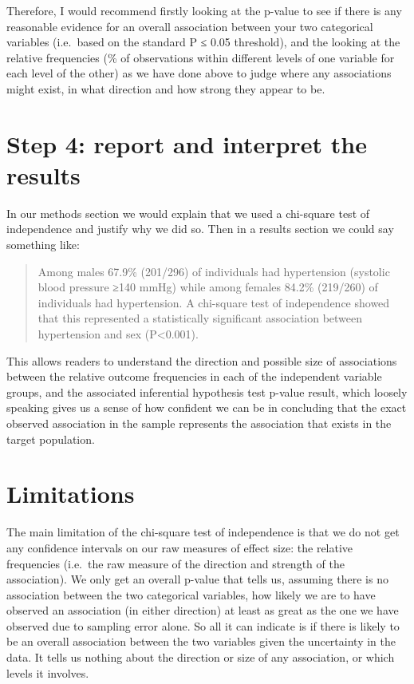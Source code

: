 \documentclass[
]{book}
\begin{document}
Therefore, I would recommend firstly looking at the p-value to see if there is any reasonable evidence for an overall association between your two categorical variables (i.e.~based on the standard P ≤ 0.05 threshold), and the looking at the relative frequencies (\% of observations within different levels of one variable for each level of the other) as we have done above to judge where any associations might exist, in what direction and how strong they appear to be.

\hypertarget{step-4-report-and-interpret-the-results-1}{%
\section{Step 4: report and interpret the results}\label{step-4-report-and-interpret-the-results-1}}

In our methods section we would explain that we used a chi-square test of independence and justify why we did so. Then in a results section we could say something like:

\begin{quote}
Among males 67.9\% (201/296) of individuals had hypertension (systolic blood pressure ≥140 mmHg) while among females 84.2\% (219/260) of individuals had hypertension. A chi-square test of independence showed that this represented a statistically significant association between hypertension and sex (P\textless0.001).
\end{quote}

This allows readers to understand the direction and possible size of associations between the relative outcome frequencies in each of the independent variable groups, and the associated inferential hypothesis test p-value result, which loosely speaking gives us a sense of how confident we can be in concluding that the exact observed association in the sample represents the association that exists in the target population.

\hypertarget{limitations-3}{%
\section{Limitations}\label{limitations-3}}

The main limitation of the chi-square test of independence is that we do not get any confidence intervals on our raw measures of effect size: the relative frequencies (i.e.~the raw measure of the direction and strength of the association). We only get an overall p-value that tells us, assuming there is no association between the two categorical variables, how likely we are to have observed an association (in either direction) at least as great as the one we have observed due to sampling error alone. So all it can indicate is if there is likely to be an overall association between the two variables given the uncertainty in the data. It tells us nothing about the direction or size of any association, or which levels it involves.
\end{document}
